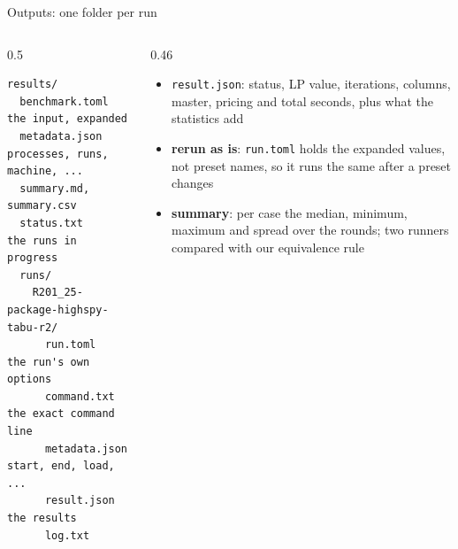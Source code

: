\documentclass[aspectratio=169]{beamer}
\begin{document}
\begin{frame}[fragile]{Outputs: one folder per run}
  \begin{columns}[T]
    \begin{column}{0.5\textwidth}
\begin{lstlisting}
results/
  benchmark.toml   the input, expanded
  metadata.json    processes, runs, machine, ...
  summary.md, summary.csv
  status.txt       the runs in progress
  runs/
    R201_25-package-highspy-tabu-r2/
      run.toml       the run's own options
      command.txt    the exact command line
      metadata.json  start, end, load, ...
      result.json    the results
      log.txt
\end{lstlisting}
    \end{column}
    \begin{column}{0.46\textwidth}
      \begin{itemize}\small
        \item \texttt{result.json}: status, LP value, iterations, columns, master, pricing and total seconds,
          plus what the statistics add
        \item \textbf{rerun as is}: \texttt{run.toml} holds the expanded values, not preset names, so it runs
          the same after a preset changes
        \item \textbf{summary}: per case the median, minimum, maximum and spread over the rounds; two runners
          compared with our equivalence rule
      \end{itemize}
    \end{column}
  \end{columns}
\end{frame}
\end{document}
